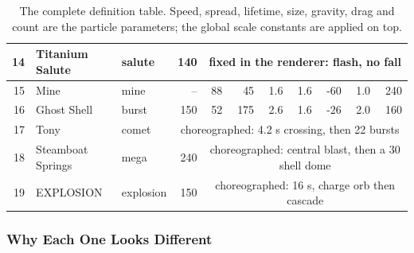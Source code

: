 \documentclass[12pt,letterpaper]{article}
\begin{document}
\begin{table}[H]
\begin{tabular}{|r|p{2.5cm}|p{1.6cm}|r|r|r|r|r|r|r|r|}
\hline
14 & Titanium Salute   & salute    & 140 & \multicolumn{7}{c|}{fixed in the renderer: flash, no fall} \\
\hline
15 & Mine              & mine      & --  & 88 & 45  & 1.6 & 1.6 & -60 & 1.0 & 240 \\
\hline
16 & Ghost Shell       & burst     & 150 & 52 & 175 & 2.6 & 1.6 & -26 & 2.0 & 160 \\
\hline
17 & Tony              & comet     & \multicolumn{8}{c|}{choreographed: 4.2 s crossing, then 22 bursts} \\
\hline
18 & Steamboat Springs & mega      & 240 & \multicolumn{7}{c|}{choreographed: central blast, then a 30 shell dome} \\
\hline
19 & EXPLOSION         & explosion & 150 & \multicolumn{7}{c|}{choreographed: 16 s, charge orb then cascade} \\
\hline
\end{tabular}
\caption{The complete definition table. Speed, spread, lifetime, size, gravity, drag and count are the particle parameters; the global scale constants are applied on top.}
\end{table}

\subsubsection{Why Each One Looks Different}
\end{document}
